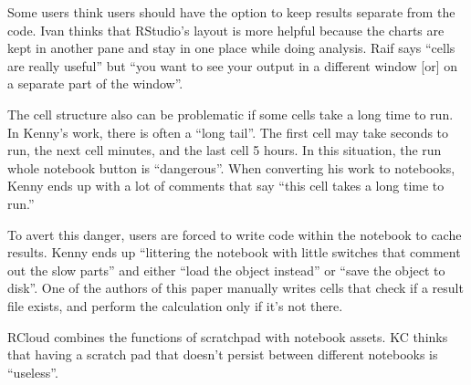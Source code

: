 Some users think users should have the option to keep results separate from the
code.  Ivan thinks that RStudio's layout is more helpful because the charts
are kept in another pane and stay in one place while doing analysis. Raif says
``cells are really useful'' but ``you want to see your output in a different
window [or] on a separate part of the window''.

The cell structure also can be problematic if some cells take a long time to
run. In Kenny's work, there is often a ``long tail''.  The first cell may take
seconds to run, the next cell minutes, and the last cell 5 hours.  In this
situation, the run whole notebook button is ``dangerous''. When converting
his work to notebooks, Kenny ends up with a lot of comments that say ``this cell
takes a long time to run.''

To avert this danger, users are forced to write code within the notebook to
cache results. Kenny ends up ``littering the notebook with little switches that
comment out the slow parts'' and either ``load the object instead'' or ``save
the object to disk''. One of the authors of this paper manually writes cells
that check if a result file exists, and perform the calculation only if it's not
there.


RCloud combines the functions of scratchpad with notebook assets. KC thinks
that having a scratch pad that doesn't persist between different notebooks is
``useless''.




